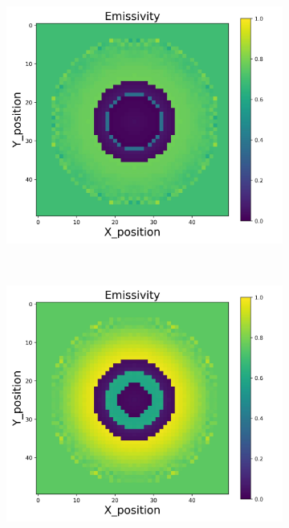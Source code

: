 \begin{figure}[p]
\begin{minipage}{\textwidth}
\begin{subfigure}{0.325\textwidth}
        \end{subfigure}
        \begin{subfigure}{0.325\textwidth}
            \centering
            \includegraphics[width=\textwidth]{figures/raw_data/21/quad/emi_cal.jpg}
        \end{subfigure}
    \end{minipage}\\
    \begin{minipage}{\textwidth}
        \centering
        \begin{subfigure}{0.325\textwidth}
            \centering
            \includegraphics[width=\textwidth]{figures/raw_data/22/quad/emi_cal.jpg}

\end{subfigure}
\end{minipage}
\end{figure}
